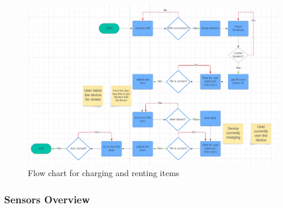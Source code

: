\begin{figure}[h]
    \centering
    \includegraphics[width = \textwidth]{images/Arduino/flowchart_ard.png}
    \caption{Flow chart for charging and renting items}
    \label{fig:flowchart}
\end{figure}

\newpage

\subsubsection{Sensors Overview}\label{sec:ArduinoSensors}

